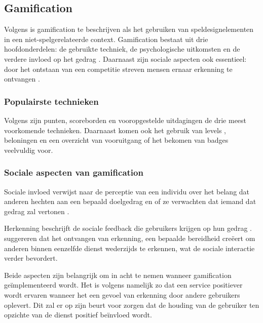 
\subsection{Gamification}

Volgens \textcite{Deterding2011} is gamification te beschrijven als het gebruiken van speldesignelementen in een niet-spelgerelateerde context. Gamification bestaat uit drie hoofdonderdelen: de gebruikte techniek, de psychologische uitkomsten en de verdere invloed op het gedrag \autocite{Hamari2014}. Daarnaast zijn sociale aspecten ook essentieel: door het ontstaan van een competitie streven mensen ernaar erkenning te ontvangen \autocite{Hamari2013}.

\subsubsection{Populairste technieken}
Volgens \textcite{Hamari2014} zijn punten, scoreborden en vooropgestelde uitdagingen de drie meest voorkomende technieken. Daarnaast komen ook het gebruik van levels \autocite{Dong2012}, beloningen \autocite{Flatla2011} en een overzicht van vooruitgang of het bekomen van badges \autocite{Li2012} veelvuldig voor.

\subsubsection{Sociale aspecten van gamification}
Sociale invloed verwijst naar de perceptie van een individu over het belang dat anderen hechten aan een bepaald doelgedrag en of ze verwachten dat iemand dat gedrag zal vertonen \autocite{Ajzen1991}.

Herkenning beschrijft de sociale feedback die gebruikers krijgen op hun gedrag \autocite{Cheung2011}. \textcite{Hamari2013} suggereren dat het ontvangen van erkenning, een bepaalde bereidheid creëert om anderen binnen eenzelfde dienst wederzijds te erkennen, wat de sociale interactie verder bevordert.

Beide aspecten zijn belangrijk om in acht te nemen wanneer gamification geïmplementeerd wordt. Het is volgens \textcite{Preece2001} namelijk zo dat een service positiever wordt ervaren wanneer het een gevoel van erkenning door andere gebruikers oplevert. Dit zal er op zijn beurt voor zorgen dat de houding van de gebruiker ten opzichte van de dienst positief beïnvloed wordt.


